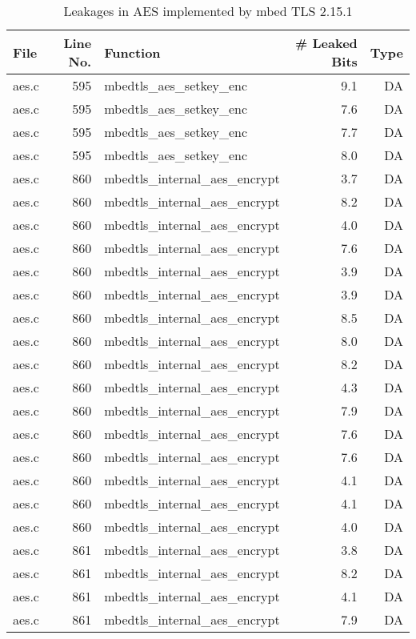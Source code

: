 \begin{table}[!ht]
\centering\tiny\scriptsize
\caption{Leakages in AES implemented by mbed TLS 2.15.1}\label{tab:AESmbed TLS2.15.1}
\begin{tabular}{lrlrr}
\hline
\textbf{File} & \textbf{Line No.} & \textbf{Function} & \textbf{\# Leaked Bits} & \textbf{Type} \\\hline
aes.c& 595&mbedtls\_aes\_setkey\_enc&9.1 &DA\\
aes.c& 595&mbedtls\_aes\_setkey\_enc&7.6 &DA\\
aes.c& 595&mbedtls\_aes\_setkey\_enc&7.7 &DA\\
aes.c& 595&mbedtls\_aes\_setkey\_enc&8.0 &DA\\
aes.c& 860&mbedtls\_internal\_aes\_encrypt&3.7 &DA\\
aes.c& 860&mbedtls\_internal\_aes\_encrypt&8.2 &DA\\
aes.c& 860&mbedtls\_internal\_aes\_encrypt&4.0 &DA\\
aes.c& 860&mbedtls\_internal\_aes\_encrypt&7.6 &DA\\
aes.c& 860&mbedtls\_internal\_aes\_encrypt&3.9 &DA\\
aes.c& 860&mbedtls\_internal\_aes\_encrypt&3.9 &DA\\
aes.c& 860&mbedtls\_internal\_aes\_encrypt&8.5 &DA\\
aes.c& 860&mbedtls\_internal\_aes\_encrypt&8.0 &DA\\
aes.c& 860&mbedtls\_internal\_aes\_encrypt&8.2 &DA\\
aes.c& 860&mbedtls\_internal\_aes\_encrypt&4.3 &DA\\
aes.c& 860&mbedtls\_internal\_aes\_encrypt&7.9 &DA\\
aes.c& 860&mbedtls\_internal\_aes\_encrypt&7.6 &DA\\
aes.c& 860&mbedtls\_internal\_aes\_encrypt&7.6 &DA\\
aes.c& 860&mbedtls\_internal\_aes\_encrypt&4.1 &DA\\
aes.c& 860&mbedtls\_internal\_aes\_encrypt&4.1 &DA\\
aes.c& 860&mbedtls\_internal\_aes\_encrypt&4.0 &DA\\
aes.c& 861&mbedtls\_internal\_aes\_encrypt&3.8 &DA\\
aes.c& 861&mbedtls\_internal\_aes\_encrypt&8.2 &DA\\
aes.c& 861&mbedtls\_internal\_aes\_encrypt&4.1 &DA\\
aes.c& 861&mbedtls\_internal\_aes\_encrypt&7.9 &DA\\

\end{tabular}
\end{table}
